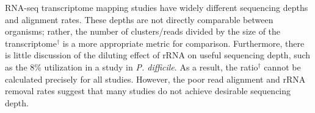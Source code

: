 \begin{table}

\caption{Study Comparison}\label{table:study_compare}
\begin{center}
\end{center}
\small
RNA-seq transcriptome mapping studies have widely different sequencing depths and alignment rates. These depths are not directly comparable between organisms; rather, the number of clusters/reads divided by the size of the transcriptome$^{\dagger}$ is a more appropriate metric for comparison. Furthermore, there is little discussion of the diluting effect of rRNA on useful sequencing depth, such as the 8\% utilization in a study in \textit{P. difficile}.\cite{115} As a result, the ratio$^{\dagger}$ cannot be calculated precisely for all studies. However, the poor read alignment and rRNA removal rates suggest that many studies do not achieve desirable sequencing depth.
\end{table}


